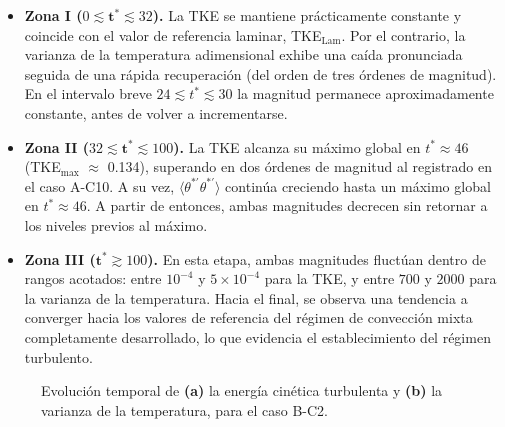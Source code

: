\begin{itemize}

  \item \textbf{Zona I ($0 \lesssim \mathbf{t^*} \lesssim 32$).} La TKE se mantiene prácticamente constante y coincide con el valor de referencia laminar, TKE$_{\text{Lam}}$. Por el contrario, la varianza de la temperatura adimensional exhibe una caída pronunciada seguida de una rápida recuperación (del orden de tres órdenes de magnitud). En el intervalo breve $24 \lesssim t^* \lesssim 30$ la magnitud permanece aproximadamente constante, antes de volver a incrementarse.

  \item \textbf{Zona II ($32 \lesssim \mathbf{t^*} \lesssim 100$).} La TKE alcanza su máximo global en $t^* \approx 46$ (TKE$_{\text{max}}$ $\approx$ 0.134), superando en dos órdenes de magnitud al registrado en el caso A-C10. A su vez, $\langle \theta^{*\prime}\theta^{*\prime}\rangle$ continúa creciendo hasta un máximo global en $t^* \approx 46$. A partir de entonces, ambas magnitudes decrecen sin retornar a los niveles previos al máximo.

  \item \textbf{Zona III ($\mathbf{t^*} \gtrsim 100$).} En esta etapa, ambas magnitudes fluctúan dentro de rangos acotados: entre $10^{-4}$ y $5 \times 10^{-4}$ para la TKE, y entre $700$ y $2000$ para la varianza de la temperatura. Hacia el final, se observa una tendencia a converger hacia los valores de referencia del régimen de convección mixta completamente desarrollado, lo que evidencia el establecimiento del régimen turbulento.

\end{itemize}


\begin{figure}[H]
  \centering  
  \caption{Evolución temporal de \textbf{(a)} la energía cinética turbulenta y \textbf{(b)} la varianza de la temperatura, para el caso B-C2.}
  \label{fig:bc2-2}
\end{figure}


